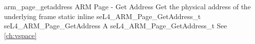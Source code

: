 %
%
%
%

\apidoc
{arm_page_getaddress}
{ARM Page - Get Address}
{Get the physical address of the underlying frame}
{static inline seL4\_ARM\_Page\_GetAddress\_t seL4\_ARM\_Page\_GetAddress}
{
}
{A seL4\_ARM\_Page\_GetAddress\_t \pagegetaddresstdesc}
{See \autoref{ch:vspace}}
